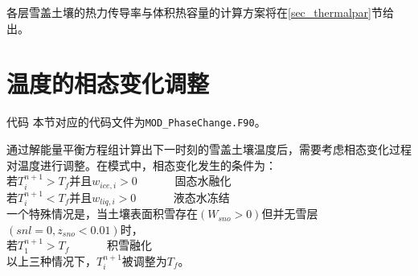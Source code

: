 各层雪盖土壤的热力传导率与体积热容量的计算方案将在\ref{sec_thermalpar}节给出。

\section{温度的相态变化调整}

\begin{mymdframed}{代码}
本节对应的代码文件为\texttt{MOD\_PhaseChange.F90}。
\end{mymdframed}

通过解能量平衡方程组计算出下一时刻的雪盖土壤温度后，需要考虑相态变化过程对温度进行调整。在模式中，相态变化发生的条件为：\\
若$T_i^{n+1}>T_f$并且$w_{ice,i}>0$ \ \   \ \  \ \   固态水融化\\
若$T_i^{n+1}<T_f$并且$w_{liq,i}>0$  \ \   \ \  \ \         液态水冻结\\
一个特殊情况是，当土壤表面积雪存在$\left(W_{sno}>0\right)$但并无雪层$\left(snl=0,z_{sno}<0.01\right)$时，\\
若$T_1^{n+1}>T_f$      \ \   \ \  \ \                 积雪融化\\
以上三种情况下，$T_i^{n+1}$被调整为$T_f$。


